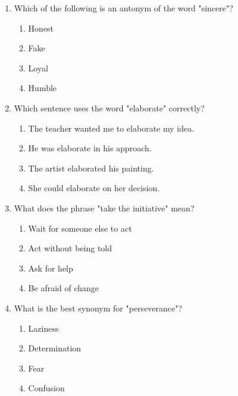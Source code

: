 \documentclass[12pt]{article}
\begin{document}
\begin{enumerate}
\vspace{0.5cm}

\item Which of the following is an antonym of the word "sincere"?
\begin{enumerate}[label=\Alph*.]
    \item Honest
    \item Fake
    \item Loyal
    \item Humble
\end{enumerate}

\vspace{0.5cm}

\item Which sentence uses the word "elaborate" correctly?
\begin{enumerate}[label=\Alph*.]
    \item The teacher wanted me to elaborate my idea.
    \item He was elaborate in his approach.
    \item The artist elaborated his painting.
    \item She could elaborate on her decision.
\end{enumerate}

\vspace{0.5cm}

\item What does the phrase "take the initiative" mean?
\begin{enumerate}[label=\Alph*.]
    \item Wait for someone else to act
    \item Act without being told
    \item Ask for help
    \item Be afraid of change
\end{enumerate}

\vspace{0.5cm}

\item What is the best synonym for "perseverance"?
\begin{enumerate}[label=\Alph*.]
    \item Laziness
    \item Determination
    \item Fear
    \item Confusion
\end{enumerate}

\vspace{0.5cm}


\end{enumerate}
\end{document}
